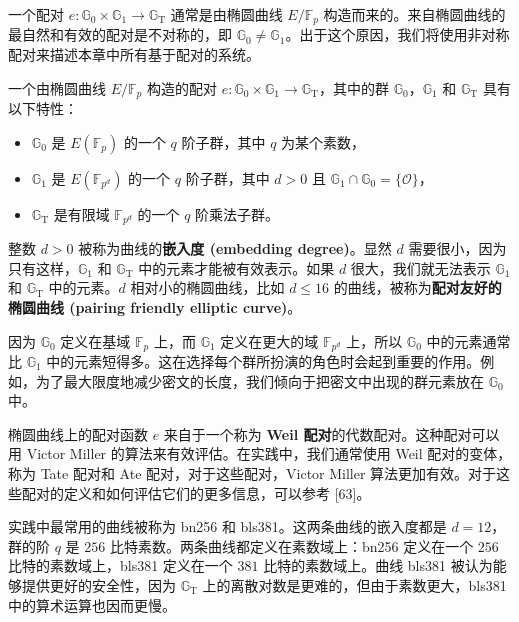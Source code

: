 \begin{snote}[从椭圆曲线构建配对。]
一个配对 $e:\mathbb{G}_0\times\mathbb{G}_1\to\mathbb{G}_\mathrm{T}$ 通常是由椭圆曲线 $E/\mathbb{F}_p$ 构造而来的。来自椭圆曲线的最自然和有效的配对是不对称的，即 $\mathbb{G}_0\neq\mathbb{G}_1$。出于这个原因，我们将使用非对称配对来描述本章中所有基于配对的系统。

一个由椭圆曲线 $E/\mathbb{F}_p$ 构造的配对 $e:\mathbb{G}_0\times\mathbb{G}_1\to\mathbb{G}_\mathrm{T}$，其中的群 $\mathbb{G}_0$，$\mathbb{G}_1$ 和 $\mathbb{G}_\mathrm{T}$ 具有以下特性：
\begin{itemize}
	\item $\mathbb{G}_0$ 是 $E(\mathbb{F}_{p})$ 的一个 $q$ 阶子群，其中 $q$ 为某个素数，
	\item $\mathbb{G}_1$ 是 $E(\mathbb{F}_{p^d})$ 的一个 $q$ 阶子群，其中 $d>0$ 且 $\mathbb{G}_1\cap\mathbb{G}_0=\{\mathcal{O}\}$，
	\item $\mathbb{G}_\mathrm{T}$ 是有限域 $\mathbb{F}_{p^d}$ 的一个 $q$ 阶乘法子群。
\end{itemize}
整数 $d>0$ 被称为曲线的\textbf{嵌入度 (embedding degree)}。显然 $d$ 需要很小，因为只有这样，$\mathbb{G}_1$ 和 $\mathbb{G}_\mathrm{T}$ 中的元素才能被有效表示。如果 $d$ 很大，我们就无法表示 $\mathbb{G}_1$ 和 $\mathbb{G}_\mathrm{T}$ 中的元素。$d$ 相对小的椭圆曲线，比如 $d\leq16$ 的曲线，被称为\textbf{配对友好的椭圆曲线 (pairing friendly elliptic curve)}。

因为 $\mathbb{G}_0$ 定义在基域 $\mathbb{F}_p$ 上，而 $\mathbb{G}_1$ 定义在更大的域 $\mathbb{F}_{p^d}$ 上，所以 $\mathbb{G}_0$ 中的元素通常比 $\mathbb{G}_1$ 中的元素短得多。这在选择每个群所扮演的角色时会起到重要的作用。例如，为了最大限度地减少密文的长度，我们倾向于把密文中出现的群元素放在 $\mathbb{G}_0$ 中。

椭圆曲线上的配对函数 $e$ 来自于一个称为 \textbf{Weil 配对}的代数配对。这种配对可以用 Victor Miller 的算法来有效评估。在实践中，我们通常使用 Weil 配对的变体，称为 Tate 配对和 Ate 配对，对于这些配对，Victor Miller 算法更加有效。对于这些配对的定义和如何评估它们的更多信息，可以参考 [63]。

实践中最常用的曲线被称为 bn256 和 bls381。这两条曲线的嵌入度都是 $d=12$，群的阶 $q$ 是 $256$ 比特素数。两条曲线都定义在素数域上：bn256 定义在一个 $256$ 比特的素数域上，bls381 定义在一个 $381$ 比特的素数域上。曲线 bls381 被认为能够提供更好的安全性，因为 $\mathbb{G}_\mathrm{T}$ 上的离散对数是更难的，但由于素数更大，bls381 中的算术运算也因而更慢。
\end{snote}

